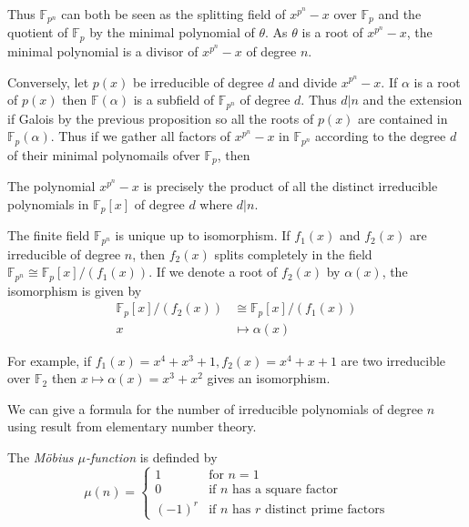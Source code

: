 \documentclass[a4paper]{article}
\begin{document}
Thus $\mathbb F_{p^n}$ can both be seen as the splitting field of $x^{p^n}-x$ over $\mathbb F_p$ and the quotient of $\mathbb F_p$ by the minimal polynomial of $\theta$. As $\theta$ is a root of $x^{p^n}-x$, the minimal polynomial is a divisor of $x^{p^n}-x$ of degree $n$.

Conversely, let $p(x)$ be irreducible of degree $d$ and divide $x^{p^n}-x$. If $\alpha$ is a root of $p(x)$ then $\mathbb F(\alpha)$ is a subfield of $\mathbb F_{p^n}$ of degree $d$. Thus $d|n$ and the extension if Galois by the previous proposition so all the roots of $p(x)$ are contained in $\mathbb F_p(\alpha)$. Thus if we gather all factors of $x^{p^n}-x$ in $\mathbb F_{p^n}$ according to the degree $d$ of their minimal polynomails ofver $\mathbb F_p$, then

\begin{proposition}
  The polynomial $x^{p^n}-x$ is precisely the product of all the distinct irreducible polynomials in $\mathbb F_p[x]$ of degree $d$ where $d|n$.
\end{proposition}

\begin{eg}
  The finite field $\mathbb F_{p^n}$ is unique up to isomorphism. If $f_1(x)$ and $f_2(x)$ are irreducible of degree $n$, then $f_2(x)$ splits completely in the field $\mathbb F_{p^n} \cong \mathbb F_p[x]/(f_1(x))$. If we denote a root of $f_2(x)$ by $\alpha(x)$, the isomorphism is given by
  \begin{align*}
    \mathbb F_p[x]/(f_2(x)) & \cong \mathbb F_p[x]/(f_1(x)) \\
    x & \mapsto \alpha(x)
  \end{align*}

  For example, if $f_1(x) = x^4+x^3+1, f_2(x) = x^4+x+1$ are two irreducible over $\mathbb F_2$ then $x \mapsto \alpha(x) = x^3+x^2$ gives an isomorphism.
\end{eg}

We can give a formula for the number of irreducible polynomials of degree $n$ using result from elementary number theory.

\begin{definition}
  The \emph{M\"obius $\mu$-function} is definded by
  \[
    \mu (n) =  
  \begin{cases}
    1 & \text{for } n = 1 \\
    0 & \text{if $n$ has a square factor} \\
    (-1)^r & \text{if $n$ has $r$ distinct prime factors}
  \end{cases}
  \]
\end{definition}
\end{document}
